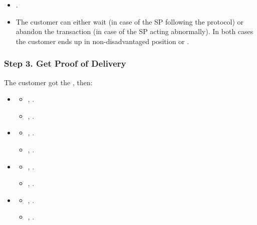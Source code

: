 \Fairness

\begin{itemize}
  \item {}.
  \item The customer can either wait (in case of the SP following the protocol) or abandon the transaction (in case of the SP acting abnormally). In both cases the customer ends up in non-disadvantaged position  or .
\end{itemize}


\subsubsection*{Step 3. \CustomerTurn{} Get Proof of Delivery}\label{step-3-get-proof-of-delivery}

The customer got the \PoD, then:

\begin{itemize}
\item \AgreeablePath
  \begin{itemize}
    \item {}, .
    \item {}, .
  \end{itemize}
\item \DisputePath
  \begin{itemize}
    \item {}, \CustomerLosesBeforePayment{}.
    \item {}, .
  \end{itemize}
\end{itemize}

\ActedAbnormallyThen{\customer}

\begin{itemize}
\item \AgreeablePath
  \begin{itemize}
    \item {}, .
    \item {}, .
  \end{itemize}
\item \DisputePath
  \begin{itemize}
    \item {}, \CustomerLosesBeforePayment{}.
    \item {}, .
  \end{itemize}
\end{itemize}

